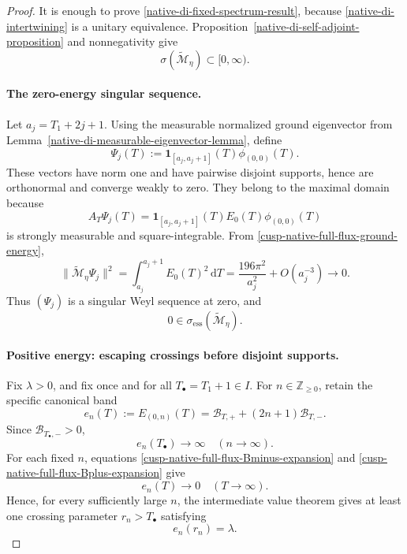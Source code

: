 \begin{proof}
It is enough to prove \eqref{native-di-fixed-spectrum-result}, because
\eqref{native-di-intertwining} is a unitary equivalence.
Proposition~\ref{native-di-self-adjoint-proposition} and nonnegativity give
\[
 \sigma(\widetilde{\mathscr M}_\eta)\subset[0,\infty).
\]

\paragraph{The zero-energy singular sequence.}
Let \(a_j=T_1+2j+1\).  Using the measurable normalized ground eigenvector
from Lemma~\ref{native-di-measurable-eigenvector-lemma}, define
\[
 \Psi_j(T)
 :=\mathbf 1_{[a_j,a_j+1]}(T)\phi_{(0,0)}(T).
\]
These vectors have norm one and have pairwise disjoint supports, hence are
orthonormal and converge weakly to zero.  They belong to the maximal
domain because
\[
 A_T\Psi_j(T)=
 \mathbf 1_{[a_j,a_j+1]}(T)E_0(T)\phi_{(0,0)}(T)
\]
is strongly measurable and square-integrable.  From
\eqref{cusp-native-full-flux-ground-energy},
\[
 \|\widetilde{\mathscr M}_\eta\Psi_j\|^2
 =\int_{a_j}^{a_j+1}E_0(T)^2\,\mathrm d T
 =\frac{196\pi^2}{a_j^2}+O(a_j^{-3})
 \longrightarrow0.
\]
Thus \((\Psi_j)\) is a singular Weyl sequence at zero, and
\[
 0\in\sigma_{\mathrm{ess}}(\widetilde{\mathscr M}_\eta).
\]

\paragraph{Positive energy: escaping crossings before disjoint supports.}
Fix \(\lambda>0\), and fix once and for all
\(T_\bullet=T_1+1\in I\).  For \(n\in\mathbb Z_{\ge0}\), retain the
specific canonical band
\begin{equation}
 e_n(T):=E_{(0,n)}(T)
 =\mathcal B_{T,+}+(2n+1)\mathcal B_{T,-}.
\label{native-di-crossing-band}
\end{equation}
Since \(\mathcal B_{T_\bullet,-}>0\),
\[
 e_n(T_\bullet)\longrightarrow\infty
 \quad(n\to\infty).
\]
For each fixed \(n\), equations
\eqref{cusp-native-full-flux-Bminus-expansion} and
\eqref{cusp-native-full-flux-Bplus-expansion} give
\[
 e_n(T)\longrightarrow0
 \quad(T\to\infty).
\]
Hence, for every sufficiently large \(n\), the intermediate value theorem
gives at least one crossing parameter \(r_n>T_\bullet\) satisfying
\begin{equation}
 e_n(r_n)=\lambda.
\label{native-di-crossing}
\end{equation}


\end{proof}
